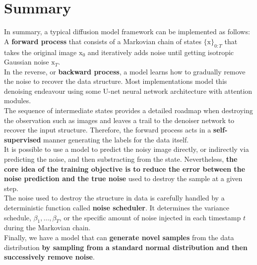 \section{Summary}

In summary, a typical diffusion model framework can be implemented as follows:\\

\noindent A \textbf{forward process} that consists of a Markovian chain of states $\{\mathrm{x}\}_{0:T}$ that takes the original image $\mathrm{x}_0$ and iteratively adds noise until getting isotropic Gaussian noise $\mathrm{x}_{T}$. \\

\noindent In the reverse, or \textbf{backward process}, a model learns how to gradually remove the noise to recover the data structure. Most implementations model this denoising endeavour using some U-net neural network architecture with attention modules. \\

\noindent The sequence of intermediate states provides a detailed roadmap when destroying the observation such as images and leaves a trail to the denoiser network to recover the input structure. Therefore, the forward process acts in a \textbf{self-supervised} manner generating the labels for the data itself. \\

\noindent It is possible to use a model to predict the noisy image directly, or indirectly via predicting the noise, and then substracting from the state. Nevertheless, \textbf{the core idea of the training objective is to reduce the error between the noise prediction and the true noise} used to destroy the sample at a given step. \\

\noindent The noise used to destroy the structure in data is carefully handled by a deterministic function called \textbf{noise scheduler}. It determines the variance schedule, $\beta_{1}, \dots, \beta_{T}$, or the specific amount of noise injected in each timestamp $t$ during the Markovian chain. \\

\noindent Finally, we have a model that can \textbf{generate novel samples} from the data distribution \textbf{by sampling from a standard normal distribution and then 
successively remove noise}.
